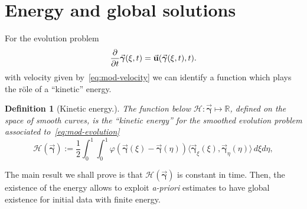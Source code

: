 \documentclass[a4paper,11pt]{article}
\numberwithin{equation}{section}
\newtheorem{definition}{Definition}
\newcommand{\R}{\mathbb{R}}
\newcommand{\la}{\langle}
\newcommand{\ra}{\rangle}
\newcommand{\U}{\mbox{$\vec{\bf u}$}}
\newcommand{\bgamma}{\mbox{$\vec{\boldsymbol \gamma}$}}
\begin{document}
\section{Energy and global solutions}\label{section_energy}
For the evolution problem
\begin{equation}\label{eq:mod-evolution}
\frac{\partial}{\partial t} \bgamma(\xi,t) =\U(\bgamma(\xi,t),t).  
\end{equation}
 with
velocity given by~\eqref{eq:mod-velocity} we can identify a function
which plays the r\"ole of a ``kinetic'' energy.
\begin{definition}[Kinetic energy.]
The function below $\mathcal{H}:\bgamma\mapsto\R$, defined on the
space of smooth curves, is the ``kinetic energy'' for the smoothed
evolution problem associated to~\eqref{eq:mod-evolution}
\begin{equation}\label{eq:energy}
\mathcal{H}(\bgamma) := \frac{1}{2} \int_0^1 \int_0^1
\varphi(\bgamma(\xi)-\bgamma(\eta)) \la 
\bgamma_\xi(\xi),  \bgamma_\eta(\eta)\ra \,d\xi d\eta,   
\end{equation}
\end{definition}
The main result we shall prove is that $\mathcal{H}(\bgamma)$ is
constant in time.  Then, the existence of the energy allows to exploit
\textit{a-priori} estimates to have global existence for initial data
with finite energy. 
\end{document}
